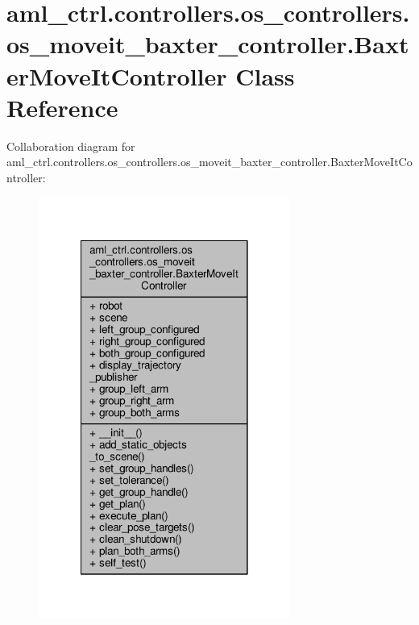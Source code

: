 \hypertarget{classaml__ctrl_1_1controllers_1_1os__controllers_1_1os__moveit__baxter__controller_1_1_baxter_move_it_controller}{\section{aml\-\_\-ctrl.\-controllers.\-os\-\_\-controllers.\-os\-\_\-moveit\-\_\-baxter\-\_\-controller.\-Baxter\-Move\-It\-Controller Class Reference}
\label{classaml__ctrl_1_1controllers_1_1os__controllers_1_1os__moveit__baxter__controller_1_1_baxter_move_it_controller}
}


Collaboration diagram for aml\-\_\-ctrl.\-controllers.\-os\-\_\-controllers.\-os\-\_\-moveit\-\_\-baxter\-\_\-controller.\-Baxter\-Move\-It\-Controller\-:
\nopagebreak
\begin{figure}[H]
\begin{center}
\leavevmode
\includegraphics[width=234pt]{classaml__ctrl_1_1controllers_1_1os__controllers_1_1os__moveit__baxter__controller_1_1_baxter_move_it_controller__coll__graph}
\end{center}
\end{figure}

